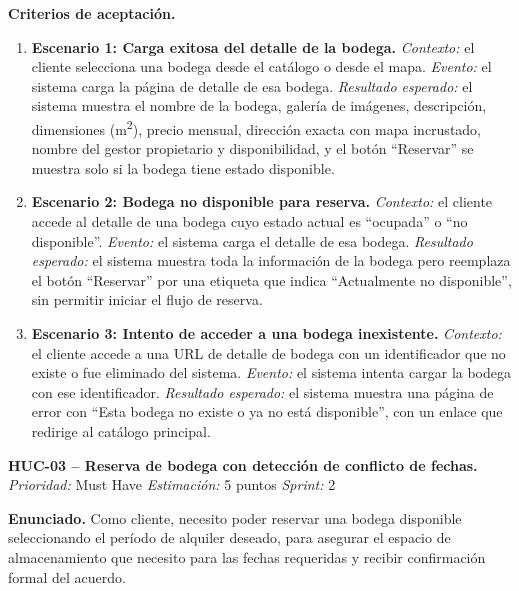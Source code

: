 \textbf{Criterios de aceptación.}
\begin{enumerate}
\item \textbf{Escenario 1: Carga exitosa del detalle de la bodega.} \textit{Contexto:} el cliente selecciona una bodega desde el catálogo o desde el mapa. \textit{Evento:} el sistema carga la página de detalle de esa bodega. \textit{Resultado esperado:} el sistema muestra el nombre de la bodega, galería de imágenes, descripción, dimensiones (m\textsuperscript{2}), precio mensual, dirección exacta con mapa incrustado, nombre del gestor propietario y disponibilidad, y el botón ``Reservar'' se muestra solo si la bodega tiene estado disponible.
\item \textbf{Escenario 2: Bodega no disponible para reserva.} \textit{Contexto:} el cliente accede al detalle de una bodega cuyo estado actual es ``ocupada'' o ``no disponible''. \textit{Evento:} el sistema carga el detalle de esa bodega. \textit{Resultado esperado:} el sistema muestra toda la información de la bodega pero reemplaza el botón ``Reservar'' por una etiqueta que indica ``Actualmente no disponible'', sin permitir iniciar el flujo de reserva.
\item \textbf{Escenario 3: Intento de acceder a una bodega inexistente.} \textit{Contexto:} el cliente accede a una URL de detalle de bodega con un identificador que no existe o fue eliminado del sistema. \textit{Evento:} el sistema intenta cargar la bodega con ese identificador. \textit{Resultado esperado:} el sistema muestra una página de error con ``Esta bodega no existe o ya no está disponible'', con un enlace que redirige al catálogo principal.
\end{enumerate}

\textbf{HUC-03 -- Reserva de bodega con detección de conflicto de fechas.} \label{req:HUC-03}
\textit{Prioridad:} Must Have \quad \textit{Estimación:} 5 puntos \quad \textit{Sprint:} 2

\textbf{Enunciado.} Como cliente, necesito poder reservar una bodega disponible seleccionando el período de alquiler deseado, para asegurar el espacio de almacenamiento que necesito para las fechas requeridas y recibir confirmación formal del acuerdo.

